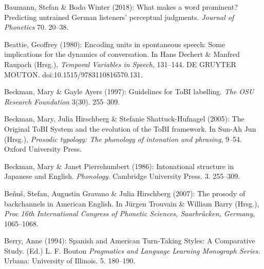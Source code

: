 \begin{styleBibliography}
Baumann, Stefan \& Bodo Winter (2018): What makes a word prominent? Predicting untrained German listeners’ perceptual judgments. \textit{Journal of Phonetics} 70. 20–38.
\end{styleBibliography}

\begin{styleBibliography}
Beattie, Geoffrey (1980): Encoding units in spontaneous speech: Some implications for the dynamics of conversation. In Hans Dechert \& Manfred Raupach (Hrsg.), \textit{Temporal Variables in Speech}, 131–144. DE GRUYTER MOUTON. doi:10.1515/9783110816570.131.
\end{styleBibliography}

\begin{styleBibliography}
Beckman, Mary \& Gayle Ayers (1997): Guidelines for ToBI labelling. \textit{The OSU Research Foundation} 3(30). 255–309.
\end{styleBibliography}

\begin{styleBibliography}
Beckman, Mary, Julia Hirschberg \& Stefanie Shattuck-Hufnagel (2005): The Original ToBI System and the evolution of the ToBI framework. In Sun-Ah Jun (Hrsg.), \textit{Prosodic typology: The phonology of intonation and phrasing}, 9–54. Oxford University Press.
\end{styleBibliography}

\begin{styleBibliography}
Beckman, Mary \& Janet Pierrehumbert (1986): Intonational structure in Japanese and English. \textit{Phonology}. Cambridge University Press. 3. 255–309.
\end{styleBibliography}

\begin{styleBibliography}
Beňuš, Stefan, Augustin Gravano \& Julia Hirschberg (2007): The prosody of backchannels in American English. In Jürgen Trouvain \& William Barry (Hrsg.), \textit{Proc 16th International Congress of Phonetic Sciences, Saarbrücken, Germany}, 1065–1068.
\end{styleBibliography}

\begin{styleBibliography}
Berry, Anne (1994): Spanish and American Turn-Taking Styles: A Comparative Study. (Ed.) L. F. Bouton \textit{Pragmatics and Language Learning Monograph Series}. Urbana: University of Illinois. 5. 180–190.
\end{styleBibliography}

